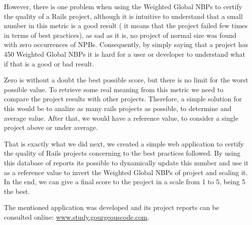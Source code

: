 However, there is one problem when using the Weighted Global NBPs to certify the quality of a Rails project, 
although it is intuitive to understand that a small number in this metric is a good result
( it means that the project failed few times in terms of best practices), as sad as it is, 
no project of normal size was found with zero occurrences of NPBs.
Consequently, by simply saying that a project has 450 Weighted Global NBPs it is hard for a user or developer
to understand what if that is a good or bad result.

Zero is without a doubt the best possible score, but there is no limit for the worst possible value.
To retrieve some real meaning from this metric we need to compare the project results with other projects.
Therefore, a simple solution for this would be to analize as many rails projects as possible, to determine and average value.
After that, we would have a reference value, to consider a single project above or under average.

That is exactly what we did next, 
we created a simple web application to certify the quality of Rails projects concerning to the best practices followed. 
By using this database of reports its possible to dynamically update this number 
and use it as a reference value to invert the Weighted Global NBPs of project and scaling it. 
In the end, we can give a final score to the project in a scale from 1 to 5, being 5 the best.

The mentioned application was developed and its project reports can be consulted online: \url{www.study.gourgeouscode.com}.










